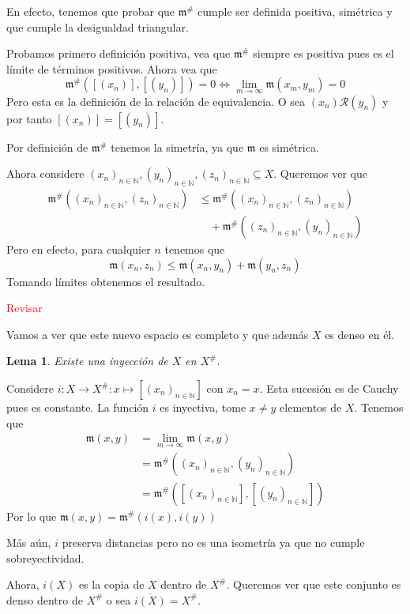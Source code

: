 \documentclass[12pt]{article}
\theoremstyle{plain}
\newtheorem{Lem}[Th]{Lema}             %
\theoremstyle{definition}
\theoremstyle{remark}
\numberwithin{equation}{section}
\newcommand{\bN}{\mathbb{N}}        %
\newcommand{\mm}{\mathfrak{m}}      %
\newcommand{\cR}{\mathcal{R}}       %
\renewcommand{\leq}{\leqslant}      %
\renewcommand{\:}{\colon}           %
\newcommand{\bonj}[1]{\left\lbrack#1\right\rbrack}
\begin{document}
\begin{multicols}{2}
\begin{ptcb}
En efecto, tenemos que probar que $\mm^\#$ cumple ser definida positiva, simétrica y que cumple la desigualdad triangular.\par
Probamos primero definición positiva, vea que $\mm^\#$ siempre es positiva pues es el límite de términos positivos. Ahora vea que
$$\mm^\#(\bonj{(x_n)},\bonj{(y_n)})=0\iff \lim_{m\to\infty}\mm(x_m,y_m)=0 $$
Pero esta es la definición de la relación de equivalencia. O sea $(x_n)\cR (y_n)$ y por tanto $\bonj{(x_n)}=\bonj{(y_n)}$.


Por definición de $\mm^\#$ tenemos la simetría, ya que $\mm$ es simétrica.\par
Ahora considere $(x_n)_{n\in\bN},(y_n)_{n\in\bN},(z_n)_{n\in\bN}\subseteq X$. Queremos ver que
\begin{align*}
 \mm^\#((x_n)_{n\in\bN},(z_n)_{n\in\bN}) &\leq\mm^\#((x_n)_{n\in\bN},(z_n)_{n\in\bN})\\
   &\quad +\mm^\#((z_n)_{n\in\bN},(y_n)_{n\in\bN})
\end{align*}
Pero en efecto, para cualquier $n$ tenemos que
$$\mm(x_n,z_n)\leq \mm(x_n,y_n)+\mm(y_n,z_n)$$
Tomando límites obtenemos el resultado.\par
\textcolor{red}{Revisar}


\end{ptcb}
Vamos a ver que este nuevo espacio es completo y que además $X$ es denso en él.

\begin{Lem}
  Existe una inyección de $X$ en $X^\#$.
\end{Lem}
\begin{ptcbp}
Considere $i\colon X\to X^\#\colon x\mapsto\bonj{(x_n)_{n\in\bN}}$ con $x_n=x$. Esta sucesión es de Cauchy pues es constante. La función $i$ es inyectiva, tome $x\neq y$ elementos de $X$. Tenemos que
\begin{align*}
  \mm(x,y)&=\lim_{m\to\infty}\mm(x,y) \\
  &=\mm^\#((x_n)_{n\in\bN},(y_n)_{n\in\bN}) \\
   &=\mm^\#(\bonj{(x_n)_{n\in\bN}},\bonj{(y_n)_{n\in\bN}})
\end{align*}
Por lo que $\mm(x,y)=\mm^\#(i(x),i(y))$
\end{ptcbp}
Más aún, $i$ preserva distancias pero no es una isometría ya que no cumple sobreyectividad.\par
Ahora, $i(X)$ es la copia de $X$ dentro de $X^\#$. Queremos ver que este conjunto es denso dentro de $X^\#$ o sea $\overline{i(X)}=X^\#$.


\end{multicols}
\end{document}
